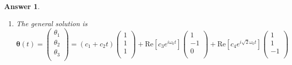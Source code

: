 \documentclass[a4paper]{article}
\newtheorem{ans}{Answer}[section]
\theoremstyle{new}
\begin{document}
\begin{ans}
\begin{enumerate}[label=(\alph*)]
$$T=\frac{1}{2}m\dot{\theta}^2+\frac{1}{2}m\dot{\theta}_2^2+\frac{1}{2}2m\dot{\theta}_3^2=\frac{1}{2}m\begin{pmatrix}\dot{\theta}_1&\dot{\theta}_2&\dot{\theta}_3\\\end{pmatrix}\begin{pmatrix}1&0&0\\0&1&0\\0&0&2\\\end{pmatrix}\begin{pmatrix}\dot{\theta}_1\\\dot{\theta}_2\\\dot{\theta}_3\\\end{pmatrix}$$
Let $V=0.5k\boldsymbol{\theta}^T\mathcal{V}\boldsymbol{\theta}$ and $T=0.5m\boldsymbol{\dot{\theta}}^T\mathcal{T}\boldsymbol{\dot{\theta}}$. We thus solve for $0=\det(\mathcal{V}-m\omega^2\mathcal{T})$:
$$0=\det\begin{pmatrix}2k-m\omega^2&-k&-k\\-k&2k-m\omega^2&-k\\-k&-k&2k-2m\omega^2\\\end{pmatrix}=(2k-m\omega^2)((2k-m\omega^2)(2k-2m\omega^2)-k^2)-2k^2(3k-2m\omega^2)$$
which have solutions $\omega^2=0$, $\omega^2=\frac{k}{m}$ and $\omega^2=\frac{2k}{m}$. By inspection, the eigenvector for the zero mode is $(1,1,1)^T$, i.e. rotation with constant angular velocity. For $\omega^2=\frac{k}{m}$, the eigenvector is $(1,-1,0)^T$, with the lighter masses moving in anti-phase with respect to each other, but the heavier mass stationary. For $\omega^2=\frac{2k}{m}$, the eigenvector is $(1,1,-1)^T$, with the lighter masses moving in phase, but in anti-phase with the heavier mass.
\item The general solution is
$$\boldsymbol{\theta}(t)=\begin{pmatrix}\theta_1\\\theta_2\\\theta_3\\\end{pmatrix}=(c_1+c_2t)\begin{pmatrix}1\\1\\1\\\end{pmatrix}+\text{Re}[c_3e^{i\omega_0t}]\begin{pmatrix}1\\-1\\0\\\end{pmatrix}+\text{Re}[c_4e^{i\sqrt{2}\omega_0t}]\begin{pmatrix}1\\1\\-1\\\end{pmatrix}$$

\end{enumerate}
\end{ans}
\end{document}
